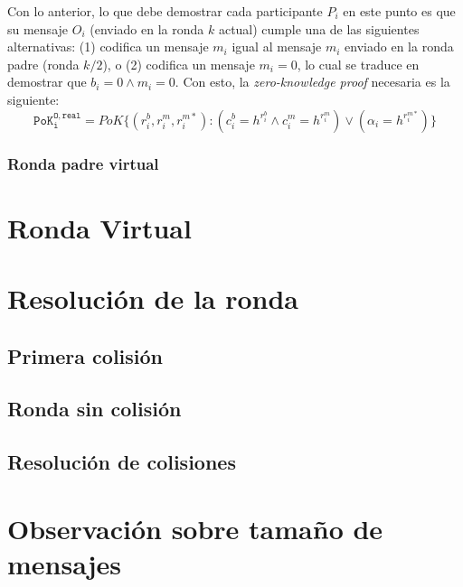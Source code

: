 Con lo anterior, lo que debe demostrar cada participante $P_i$ en este punto es que su mensaje $O_i$ (enviado en la ronda $k$ actual) cumple una de las siguientes alternativas: (1) codifica un mensaje $m_i$ igual al mensaje $m_i$ enviado en la ronda padre (ronda $k/2$), o (2) codifica un mensaje $m_i = 0$, lo cual se traduce en demostrar que $b_i = 0 \land m_i = 0$. Con esto, la \emph{zero-knowledge proof} necesaria es la siguiente: $$\mathtt{PoK_i^{O, real}} = PoK\{(r_i^b, r_i^m, r_i^{m*}) : (c_i^b = h^{r_i^b} \land c_i^m = h^{r_i^m}) \lor (\alpha_i = h^{r_i^{m*}}) \}$$



\subsubsection{Ronda padre virtual}

\section{Ronda Virtual}
\section{Resolución de la ronda}
\subsection{Primera colisión}
\subsection{Ronda sin colisión}
\subsection{Resolución de colisiones}
\section{Observación sobre tamaño de mensajes}